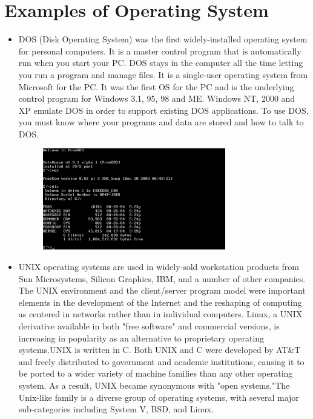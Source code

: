 \documentclass[11pt,a4paper]{article}
\begin{document}
	\section{Examples of Operating System}
	\begin{itemize}
		\item DOS (Disk Operating System) was the first widely-installed operating system for personal computers. It is a master control program that is automatically run when you start your PC. DOS stays in the computer all the time letting you run a program and manage files. It is a single-user operating system from Microsoft for the PC. It was the first OS for the PC and is the underlying control program for Windows 3.1, 95, 98 and ME. Windows NT, 2000 and XP emulate DOS in order to support existing DOS applications. To use DOS, you must know where your programs and data are stored and how to talk to DOS.
			\begin{figure}[h!]
				\includegraphics{dos.png}
				\centering
			\end{figure} 
		\item UNIX operating systems are used in widely-sold workstation products from Sun Microsystems, Silicon Graphics, IBM, and a number of other companies. The UNIX environment and the client/server program model were important elements in the development of the Internet and the reshaping of computing as centered in networks rather than in individual computers. Linux, a UNIX derivative available in both "free software" and commercial versions, is increasing in popularity as an alternative to proprietary operating systems.UNIX is written in C. Both UNIX and C were developed by AT\&T and freely distributed to government and academic institutions, causing it to be ported to a wider variety of machine families than any other operating system. As a result, UNIX became synonymous with "open systems."The Unix-like family is a diverse group of operating systems, with several major sub-categories including System V, BSD, and Linux.
		\newpage
			\begin{figure}[h!]

\end{figure}
\end{itemize}
\end{document}
